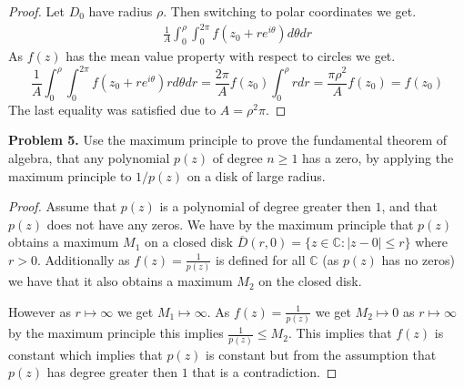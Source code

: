 \documentclass[letter,12pt,reqno]{article}
\begin{document}
\begin{proof}
    Let $D_0$ have radius $\rho$. Then switching to polar coordinates we get.
    \begin{align*}
    \frac{1}{A}\int_0^\rho\int_0^{2\pi}f(z_0+re^{i\theta})d\theta dr
    \end{align*}
    As $f(z)$ has the mean value property with respect to circles we get.
    \[
        \frac{1}{A}\int_0^\rho\int_0^{2\pi}f(z_0+re^{i\theta})rd\theta dr
        =\frac{2\pi}{A}f(z_0) \int_0^\rho r dr=\frac{\pi\rho^2}{A}f(z_0) =f(z_0)
    \]
    The last equality was satisfied due to $A=\rho^2 \pi$.
\end{proof}

\begin{tcolorbox}
    \textbf{Problem 5.}
    Use the maximum principle to prove the fundamental theorem of algebra, that any polynomial $p(z)$ of degree $n \geq 1$ has a zero, by applying the maximum principle to $1/p(z)$ on a disk of large radius.  
\end{tcolorbox}

\begin{proof}
    Assume that $p(z)$ is a polynomial of degree greater then $1$, and that $p(z)$ does not have any zeros. We have by the maximum principle that $p(z)$ obtains a maximum $M_1$ on a closed disk $\overline D(r,0)=\{z\in \mathbb{C}: |z-0|\leq r\}$ where $r>0$. Additionally as $f(z)=\frac{1}{p(z)}$ is defined for all $\mathbb{C}$ (as $p(z)$ has no zeros) we have that it also obtains a maximum $M_2$ on the closed disk. 

    However as $r\mapsto \infty$ we get $M_1\mapsto \infty$. As $f(z)=\frac{1}{p(z)}$ we get $M_2 \mapsto 0$ as $r\mapsto \infty$ by the maximum principle this implies $\frac{1}{p(z)}\leq M_2$. This implies that $f(z)$ is constant which implies that $p(z)$ is constant but from the assumption that $p(z)$ has degree greater then $1$ that is a contradiction. 
\end{proof}
\end{document}
